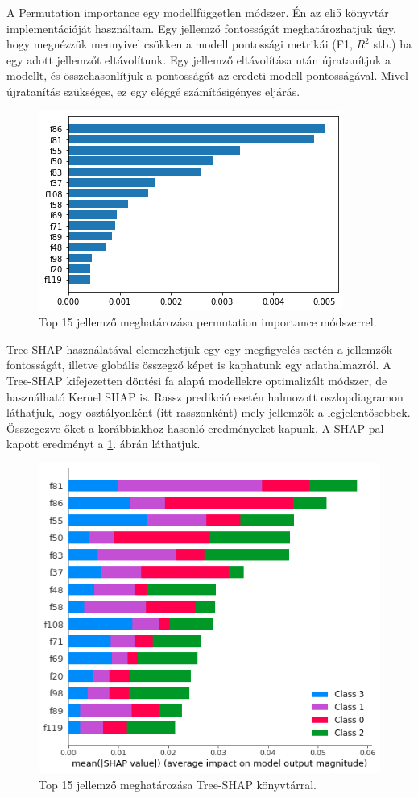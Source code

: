 A Permutation importance egy modellfüggetlen módszer. Én az eli5 \cite{eli5_2016} könyvtár implementációját használtam. Egy jellemző fontosságát meghatározhatjuk úgy, hogy megnézzük mennyivel csökken a modell pontossági metrikái (F1, $R^2$ stb.) ha egy adott jellemzőt eltávolítunk. Egy jellemző eltávolítása után újratanítjuk a modellt, és összehasonlítjuk a pontosságát az eredeti modell pontosságával. Mivel újratanítás szükséges, ez egy eléggé számításigényes eljárás.

\begin{figure}[ht]
	\centering
	\includegraphics[width=0.7\columnwidth]{figures/imp_eli.png}
	\caption{Top 15 jellemző meghatározása permutation importance módszerrel.}
\end{figure}

Tree-SHAP \cite{treeshap2020} használatával elemezhetjük egy-egy megfigyelés esetén a jellemzők fontosságát, illetve globális összegző képet is kaphatunk egy adathalmazról. A Tree-SHAP kifejezetten döntési fa alapú modellekre optimalizált módszer, de használható Kernel SHAP is. Rassz predikció esetén halmozott oszlopdiagramon láthatjuk, hogy osztályonként (itt rasszonként) mely jellemzők a legjelentősebbek. Összegezve őket a korábbiakhoz hasonló eredményeket kapunk. A SHAP-pal kapott eredményt a \ref{fig:shap}. ábrán láthatjuk.

\begin{figure}[ht]
	\centering
	\includegraphics[width=0.7\columnwidth]{figures/imp_shap.png}
	\caption{Top 15 jellemző meghatározása Tree-SHAP könyvtárral.}
	\label{fig:shap}
\end{figure}

